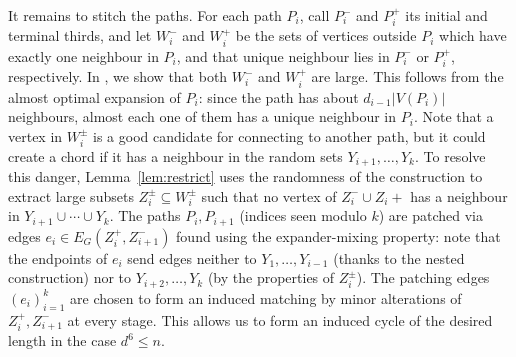 \documentclass[reqno,a4paper]{amsart}
\theoremstyle{definition}
\begin{document}
It remains to stitch the paths. For each path $P_i$, call $P_i^-$ and $P_i^+$ its initial and terminal thirds, and let $W_i^-$ and $W_i^+$ be the sets of vertices outside $P_i$ which have exactly one neighbour in $P_i$, and that unique neighbour lies in $P_i^-$ or $P_i^+$, respectively. 
In , we show that both $W_i^-$ and $W_i^+$ are large. This follows from the almost optimal expansion of $P_i$: since the path has about $d_{i-1}|V(P_i)|$ 
neighbours, almost each one of them has a unique neighbour in $P_i$. 
Note that a vertex in $W_i^\pm$ is a good candidate for connecting to another path, but it could create a chord if it has a neighbour in the random sets $Y_{i+1}, \ldots, Y_k$. To resolve this danger, Lemma~\ref{lem:restrict} uses the randomness of the construction to extract large subsets $Z_i^\pm\subseteq W_i^\pm$ such that no vertex of $Z_i^-\cup Z_i+$ has a neighbour in $Y_{i+1}\cup\cdots\cup Y_k$. 
The paths $P_i,P_{i+1}$ (indices seen modulo $k$) are patched via edges $e_i\in E_G(Z_i^+,Z_{i+1}^-)$
found using the expander-mixing property: note that the endpoints of $e_i$ send edges neither to $Y_1,\ldots,Y_{i-1}$ (thanks to the nested construction) nor to $Y_{i+2},\ldots,Y_k$ (by the properties of $Z_i^\pm$). 
The patching edges $(e_i)_{i=1}^k$ are chosen to form an induced matching by minor alterations of $Z_i^+,Z_{i+1}^-$ at every stage.
This allows us to form an induced cycle of the desired length in the case $d^6\le n$.

\end{document}
